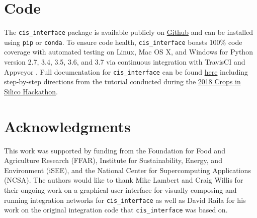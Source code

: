 \documentclass[journal]{IEEEtran}
\newcommand{\todo}[1]{{\color{red}{#1}}}
\newcommand{\cis}{{\tt cis\_interface}{}}
\begin{document}
\section*{Code}\label{S:code}
The {\cis} package is available publicly on \href{https://github.com/cropsinsilico/cis_interface}{Github} and can be 
installed using {\tt pip} or {\tt conda}. To ensure code health, {\cis} boasts 100\% code coverage with automated testing on Linux, Mac OS X, and Windows for Python version 2.7, 3.4, 3.5, 3.6, and 3.7 via continuous integration with TravisCI \citep{travisci} and Appveyor \citep{appveyor}. Full documentation for {\cis} can be found \href{https://cropsinsilico.github.io/cis_interface/}{here} including step-by-step directions from the tutorial conducted during the \href{https://cropsinsilico.github.io/cis_interface/hackathon2018/index.html}{2018 Crops in Silico Hackathon}.


\section*{Acknowledgments}
\ifieee
\else
\acknowledgments
\fi
%
This work was supported by funding from the Foundation for Food and Agriculture Research (FFAR), Institute for Sustainability, Energy, and Environment (iSEE), and the National Center for Supercomputing Applications (NCSA).
The authors would like to thank Mike Lambert and Craig Willis for their ongoing work on a graphical user interface for visually composing and running integration networks for {\cis} as well as David Raila for his work on the original integration code that {\cis} was based on.
\end{document}

